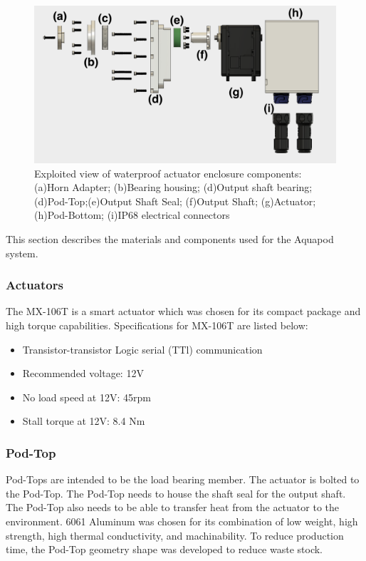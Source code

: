 \begin{figure}[h]
\centering
\includegraphics[width=1.0\columnwidth]{./img/aquaPod-exploded.png}
\caption{Exploited view of waterproof actuator enclosure components: (a)Horn Adapter; (b)Bearing housing; (d)Output shaft bearing; (d)Pod-Top;(e)Output Shaft Seal; (f)Output Shaft; (g)Actuator; (h)Pod-Bottom; (i)IP68 electrical connectors }
\label{fig:pod exploted}
\end{figure}


This section describes the materials and components used for the Aquapod system.


\subsubsection{Actuators}
The MX-106T is a smart actuator which was chosen for its compact package and high torque capabilities. 
Specifications for MX-106T are listed below: 
\begin{itemize}
    \item Transistor-transistor Logic serial (TTl) communication 
    
    \item Recommended voltage: 12V

    \item No load speed at 12V: 45rpm

    \item Stall torque at 12V: 8.4 Nm

\end{itemize}

\subsubsection{Pod-Top}
Pod-Tops are intended to be the load bearing member. The actuator is bolted to the Pod-Top. The Pod-Top needs to house the shaft seal for the output shaft. The Pod-Top also needs to be able to transfer heat from the actuator to the environment. 
6061 Aluminum was chosen for its combination of low weight, high strength, high thermal conductivity, and machinability. To reduce production time, the Pod-Top geometry shape was developed to reduce waste stock.

